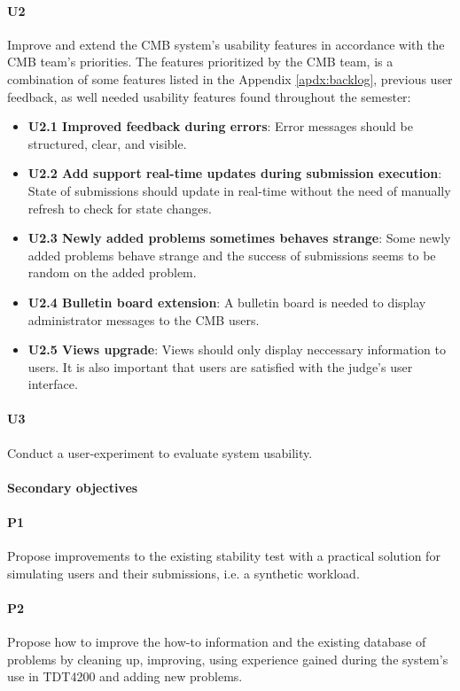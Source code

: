 \paragraph*{U2} Improve and extend the CMB system's usability features in accordance with the CMB team's priorities. The features prioritized by the CMB team, is a combination of some features listed in the Appendix \ref{apdx:backlog}, previous user feedback, as well needed usability features found throughout the semester:
  \begin{itemize}
    \item \textbf{U2.1 Improved feedback during errors}: Error messages should be structured, clear, and visible.
    \item \textbf{U2.2 Add support real-time updates during submission execution}: State of submissions should update in real-time without the need of manually refresh to check for state changes.
    \item \textbf{U2.3 Newly added problems sometimes behaves strange}: Some newly added problems behave strange and the success of submissions seems to be random on the added problem.
    \item \textbf{U2.4 Bulletin board extension}: A bulletin board is needed to display administrator messages to the CMB users.
    \item \textbf{U2.5 Views upgrade}: Views should only display neccessary information to users. It is also important that users are satisfied with the judge's user interface.
  \end{itemize}

\paragraph*{U3} Conduct a user-experiment to evaluate system usability.

\paragraph*{Secondary objectives} \hfill

\paragraph*{P1} Propose improvements to the existing stability test with a practical solution for simulating users and their submissions, i.e. a synthetic workload.

\paragraph*{P2}  Propose how to improve the how-to information and the existing database of problems by cleaning up, improving, using experience gained during the system's use in TDT4200 \cite{TDT4200} and adding new problems.

